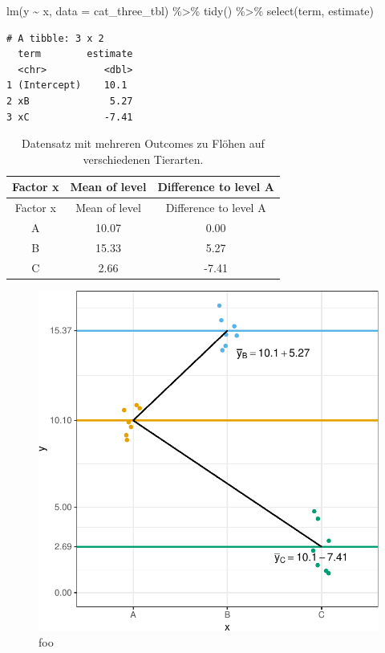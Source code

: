 \documentclass[
  letterpaper,
]{scrbook}
\newenvironment{Shaded}{\begin{snugshade}}{\end{snugshade}}
\newcommand{\AttributeTok}[1]{\textcolor[rgb]{0.40,0.45,0.13}{#1}}
\newcommand{\FunctionTok}[1]{\textcolor[rgb]{0.28,0.35,0.67}{#1}}
\newcommand{\NormalTok}[1]{\textcolor[rgb]{0.00,0.23,0.31}{#1}}
\newcommand{\SpecialCharTok}[1]{\textcolor[rgb]{0.37,0.37,0.37}{#1}}
\begin{document}
\begin{Shaded}
\begin{Highlighting}[]
\FunctionTok{lm}\NormalTok{(y }\SpecialCharTok{\textasciitilde{}}\NormalTok{ x, }\AttributeTok{data =}\NormalTok{ cat\_three\_tbl) }\SpecialCharTok{\%\textgreater{}\%} 
  \FunctionTok{tidy}\NormalTok{() }\SpecialCharTok{\%\textgreater{}\%} 
  \FunctionTok{select}\NormalTok{(term, estimate)}
\end{Highlighting}
\end{Shaded}

\begin{verbatim}
# A tibble: 3 x 2
  term        estimate
  <chr>          <dbl>
1 (Intercept)    10.1 
2 xB              5.27
3 xC             -7.41
\end{verbatim}

\hypertarget{tbl-cat-3}{}
\begin{longtable}[]{@{}ccc@{}}
\caption{\label{tbl-cat-3}Datensatz mit mehreren Outcomes zu Flöhen auf
verschiedenen Tierarten.}\tabularnewline
\toprule()
Factor x & Mean of level & Difference to level A \\
\midrule()
\endfirsthead
\toprule()
Factor x & Mean of level & Difference to level A \\
\midrule()
\endhead
A & 10.07 & 0.00 \\
B & 15.33 & 5.27 \\
C & 2.66 & -7.41 \\
\bottomrule()
\end{longtable}

\begin{figure}

{\centering \includegraphics{./stat-modeling-basic_files/figure-pdf/fig-stat-modeling-basic-02-1.pdf}

}

\caption{\label{fig-stat-modeling-basic-02}foo}

\end{figure}
\end{document}
